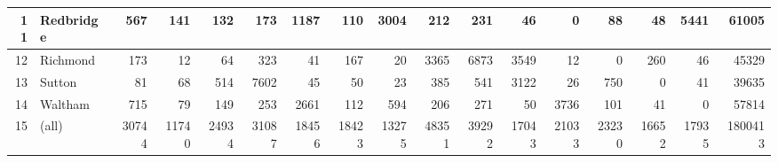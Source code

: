 \documentclass[11pt]{article} %
\begin{document}
\begin{table}
\begin{tabular}{|r|l|r|r|r|r|r|r|r|r|r|r|r|r|r|r|r|}
11 & Redbridge & 567 & 141 & 132 & 173 & 1187 & 110 & 3004 & 212 & 231 & 46 & 0 & 88 & 48 & 5441 & 61005 \\ \hline
12 & Richmond & 173 & 12 & 64 & 323 & 41 & 167 & 20 & 3365 & 6873 & 3549 & 12 & 0 & 260 & 46 & 45329 \\ \hline
13 & Sutton & 81 & 68 & 514 & 7602 & 45 & 50 & 23 & 385 & 541 & 3122 & 26 & 750 & 0 & 41 & 39635 \\ \hline
14 & Waltham & 715 & 79 & 149 & 253 & 2661 & 112 & 594 & 206 & 271 & 50 & 3736 & 101 & 41 & 0 & 57814 \\ \hline
15 & (all) & 30744 & 11740 & 24934 & 31087 & 18456 & 18423 & 13275 & 48351 & 39292 & 17043 & 21033 & 23230 & 16652 & 17935 & 1800413 \\ \hline
\end{tabular}
\label{Actual Flows Outer}
\end{table}

\end{document}
